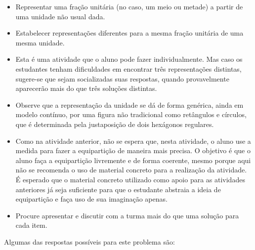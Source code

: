 \begin{multicols}{2}
\begin{objetivos}{}{}
\begin{itemize} %
    \item       Representar uma fração unitária (no caso, um meio ou metade) a partir de uma unidade não usual dada.
    \item       Estabelecer representações diferentes para a mesma fração unitária de uma mesma unidade.
\end{itemize} %
 \end{objetivos}

\begin{orientacoes}
\begin{itemize} %
   \item Esta é uma atividade que o aluno pode fazer individualmente. Mas caso os estudantes tenham dificuldades em encontrar três representações distintas, sugere-se que sejam socializadas suas respostas, quando provavelmente aparecerão mais do que três soluções distintas.
   \item Observe que a representação da unidade se dá de forma genérica, ainda em modelo contínuo, por uma figura não tradicional como retângulos e círculos, que é determinada pela justaposição de dois hexágonos regulares.
   \item       Como na atividade anterior, não se espera que, nesta atividade, o aluno use a medida para fazer a equipartição de maneira mais precisa. O objetivo é que o aluno faça a equipartição livremente e de forma coerente,  mesmo porque aqui não se recomenda o uso de material concreto para a realização da atividade. É esperado que o material concreto utilizado como apoio para as atividades anteriores já seja suficiente para que o estudante abstraia a ideia de equipartição e faça uso de sua imaginação apenas.
   \item Procure apresentar e discutir com a turma mais do que uma solução para cada item.
\end{itemize} %
\end{orientacoes}

\begin{solucao}{}{}
Algumas das respostas possíveis para este problema são:
\begin{center}
\hspace{.2cm}


\end{center}
\end{solucao}
\end{multicols}
